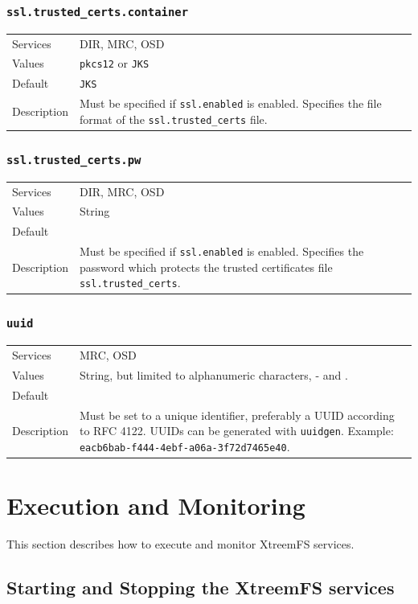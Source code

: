 \documentclass[a4paper,10pt]{book}
\begin{document}
\subsubsection{\texttt{ssl.trusted\_certs.container}}
\begin{tabular}{lp{10cm}}
 Services & DIR, MRC, OSD\\
 Values   & \texttt{pkcs12} or \texttt{JKS}\\
 Default  & \texttt{JKS}\\
 Description & Must be specified if \texttt{ssl.enabled} is enabled. Specifies the file format of the \texttt{ssl.trusted\_certs} file.
\end{tabular}

\subsubsection{\texttt{ssl.trusted\_certs.pw}}
\begin{tabular}{lp{10cm}}
 Services & DIR, MRC, OSD\\
 Values   & String\\
 Default  & \\
 Description & Must be specified if \texttt{ssl.enabled} is enabled. Specifies the password which protects the trusted certificates file \texttt{ssl.trusted\_certs}.
\end{tabular}

\subsubsection{\texttt{uuid}}
\begin{tabular}{lp{10cm}}
 Services & MRC, OSD\\
 Values   & String, but limited to alphanumeric characters, - and . \\
 Default  & \\
 Description & Must be set to a unique identifier, preferably a UUID according to RFC 4122. UUIDs can be generated with \texttt{uuidgen}. Example: \texttt{eacb6bab-f444-4ebf-a06a-3f72d7465e40}.
\end{tabular}

\section{Execution and Monitoring}
This section describes how to execute and monitor XtreemFS services.

\subsection{Starting and Stopping the XtreemFS services}
\label{sec:startstopservice}
\end{document}

